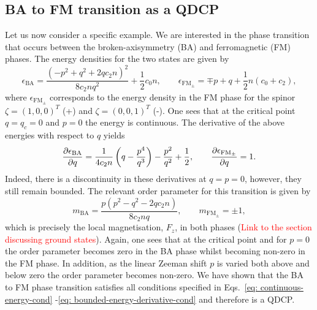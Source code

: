 \subsection{BA to FM transition as a QDCP}
Let us now consider a specific example.
We are interested in the phase transition that occurs between the
broken-axisymmetry (BA) and ferromagnetic (FM) phases.
The energy densities for the two states are given by~\cite{Kawaguchi2012}
\begin{equation}
    \epsilon_\mathrm{BA} = \frac{{(-p^2 + q^2 +2qc_2n)}^2}{8c_2nq^2} 
    + \frac{1}{2}c_0n, \qquad
    \epsilon_\mathrm{FM_{\pm}} = \mp p + q + \frac{1}{2}n(c_0 + c_2),
\end{equation}
where \( \epsilon_\mathrm{FM_{\pm}} \) corresponds to the energy density in the
FM phase for the spinor \( \zeta = {(1, 0, 0)}^T \) (+) and
\( \zeta = {(0, 0, 1)}^T \) (-).
One sees that at the critical point \( q=q_c=0 \) and \( p=0 \) the energy is
continuous.
The derivative of the above energies with respect to \( q \) yields
\begin{equation}
    \pdv{\epsilon_\mathrm{BA}}{q} = 
    \frac{1}{4c_2n}\left(q - \frac{p^4}{q^3}\right) - \frac{p^2}{q^2}
    + \frac{1}{2},
    \qquad
    \pdv{\epsilon_\mathrm{FM_{\pm}}}{q} = 1.
\end{equation}
Indeed, there is a discontinuity in these derivatives at \( q=p=0 \), however,
they still remain bounded.
The relevant order parameter for this transition is given by
\begin{equation}
    m_\mathrm{BA} = \frac{p(p^2 - q^2 - 2qc_2n)}{8c_2nq},
    \qquad
    m_{\mathrm{FM}_{\pm}} = \pm 1,
\end{equation}
which is precisely the local magnetisation, \( F_z \), in both phases
(\textcolor{red}{Link to the section discussing ground states}).
Again, one sees that at the critical point and for \( p=0 \) the order parameter
becomes zero in the BA phase whilst becoming non-zero in the FM phase.
In addition, as the linear Zeeman shift \( p \) is varied both above and below
zero the order parameter becomes non-zero.
We have shown that the BA to FM phase transition satisfies all conditions
specified in Eqs.~\eqref{eq: continuous-energy-cond}
-\eqref{eq: bounded-energy-derivative-cond}
and therefore is a QDCP\@.

